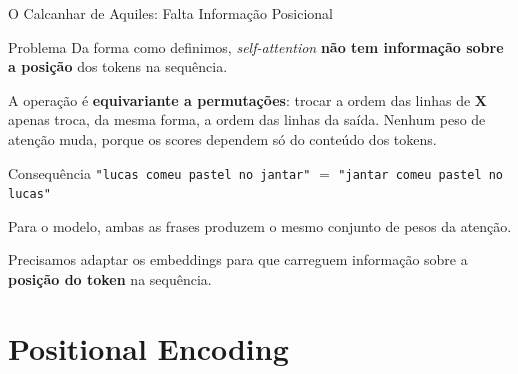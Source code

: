 \documentclass[aspectratio=169,xcolor=dvipsnames]{beamer}
\begin{document}
\begin{frame}[shrink=10]{O Calcanhar de Aquiles: Falta Informação Posicional}

\begin{alertblock}{Problema}
Da forma como definimos, \textit{self-attention} \textbf{não tem informação sobre a posição} dos tokens na sequência.
\end{alertblock}

\vspace{6pt}

A operação é \textbf{equivariante a permutações}: trocar a ordem das linhas de $\mathbf{X}$ apenas troca, da mesma forma, a ordem das linhas da saída. Nenhum peso de atenção muda, porque os scores dependem só do conteúdo dos tokens.

\vspace{8pt}

\begin{exampleblock}{Consequência}
\centering
\texttt{"lucas comeu pastel no jantar"} $=$ \texttt{"jantar comeu pastel no lucas"}

\vspace{4pt}

Para o modelo, ambas as frases produzem o mesmo conjunto de pesos da atenção.
\end{exampleblock}

\vspace{6pt}

\centering
Precisamos adaptar os embeddings para que carreguem informação sobre a \textbf{posição do token} na sequência.

\end{frame}

\section{Positional Encoding}
\end{document}
